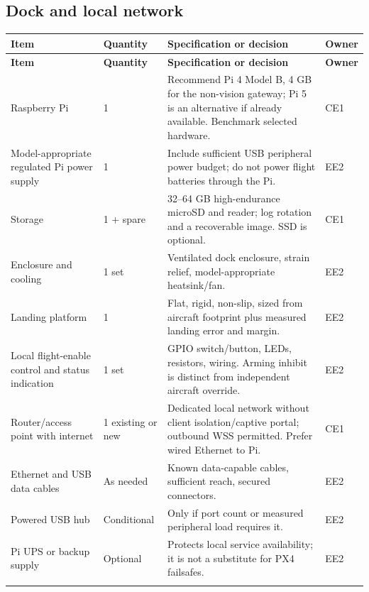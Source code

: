 \documentclass[10pt,letterpaper]{article}
\begin{document}
\subsection{Dock and local network}
\begingroup\small\begin{longtable}{P{1.562in}P{0.781in}P{3.383in}P{0.781in}}
\toprule{}\textbf{Item} & \textbf{Quantity} & \textbf{Specification or decision} & \textbf{Owner} \\\midrule\endfirsthead
\toprule{}\textbf{Item} & \textbf{Quantity} & \textbf{Specification or decision} & \textbf{Owner} \\\midrule\endhead
\bottomrule\endfoot
Raspberry Pi & 1 & Recommend Pi 4 Model B, 4 GB for the non-vision gateway; Pi 5 is an alternative if already available. Benchmark selected hardware. & CE1 \\ \addlinespace[2pt]
Model-appropriate regulated Pi power supply & 1 & Include sufficient USB peripheral power budget; do not power flight batteries through the Pi. & EE2 \\ \addlinespace[2pt]
Storage & 1 + spare & 32--64 GB high-endurance microSD and reader; log rotation and a recoverable image. SSD is optional. & CE1 \\ \addlinespace[2pt]
Enclosure and cooling & 1 set & Ventilated dock enclosure, strain relief, model-appropriate heatsink/fan. & EE2 \\ \addlinespace[2pt]
Landing platform & 1 & Flat, rigid, non-slip, sized from aircraft footprint plus measured landing error and margin. & EE2 \\ \addlinespace[2pt]
Local flight-enable control and status indication & 1 set & GPIO switch/button, LEDs, resistors, wiring. Arming inhibit is distinct from independent aircraft override. & EE2 \\ \addlinespace[2pt]
Router/access point with internet & 1 existing or new & Dedicated local network without client isolation/captive portal; outbound WSS permitted. Prefer wired Ethernet to Pi. & CE1 \\ \addlinespace[2pt]
Ethernet and USB data cables & As needed & Known data-capable cables, sufficient reach, secured connectors. & EE2 \\ \addlinespace[2pt]
Powered USB hub & Conditional & Only if port count or measured peripheral load requires it. & EE2 \\ \addlinespace[2pt]
Pi UPS or backup supply & Optional & Protects local service availability; it is not a substitute for PX4 failsafes. & EE2 \\ \addlinespace[2pt]
\end{longtable}\endgroup
\end{document}
